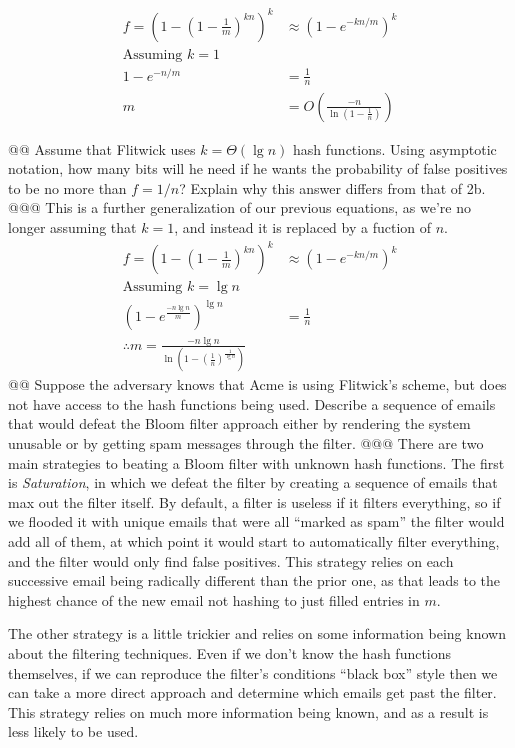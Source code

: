 \documentclass[10pt]{article}
\begin{document}
\begin{easylist}[enumerate]
    \[ \begin{aligned}
        f = {\left(1 - {\left( 1 - \frac{1}{m} \right)}^{kn} \right)}^k &\approx {\left( 1 - e^{-kn/m} \right)}^k\\
        \text{Assuming } k = 1\\
        1 -  e^{-n/m} &= \frac{1}{n}\\
        m &= O\left( \frac{-n}{\ln\left( 1 - \frac{1}{n} \right)} \right)
    \end{aligned} \]

    @@ Assume that Flitwick uses $k = \Theta(\lg n)$ hash functions. Using asymptotic notation, how many bits will he
    need if he wants the probability of false positives to be no more than $f = 1/n$? Explain why this answer differs
    from that of 2b.
    @@@ This is a further generalization of our previous equations, as we're no longer assuming that $k=1$, and instead
    it is replaced by a fuction of $n$.
    \[ \begin{aligned}
        f = {\left(1 - {\left( 1 - \frac{1}{m} \right)}^{kn} \right)}^k &\approx {\left( 1 - e^{-kn/m} \right)}^k\\
        \text{Assuming } k = \lg n\\
        {\left(1 - e^{\frac{-n\lg n}{m}} \right)}^{\lg n} &= \frac{1}{n}\\
        \therefore m = \frac{-n\lg n}{\ln \left( 1 - {\left( \frac{1}{n} \right)}^\frac{1}{\lg n}\right)}
    \end{aligned} \]
    @@ Suppose the adversary knows that Acme is using Flitwick's scheme, but does not have access to the hash functions
    being used. Describe a sequence of emails that would defeat the Bloom filter approach either by rendering the system
    unusable or by getting spam messages through the filter.
    @@@ There are two main strategies to beating a Bloom filter with unknown hash functions. The first is
    \textit{Saturation}, in which we defeat the filter by creating a sequence of emails that max out the filter itself.
    By default, a filter is useless if it filters everything, so if we flooded it with unique emails that were all
    ``marked as spam'' the filter would add all of them, at which point it would start to automatically filter
    everything, and the filter would only find false positives. This strategy relies on each successive email being
    radically different than the prior one, as that leads to the highest chance of the new email not hashing to just
    filled entries in $m$.

    The other strategy is a little trickier and relies on some information being known about the filtering techniques.
    Even if we don't know the hash functions themselves, if we can reproduce the filter's conditions ``black box'' style
    then we can take a more direct approach and determine which emails get past the filter. This strategy relies on much
    more information being known, and as a result is less likely to be used.


\end{easylist}
\end{document}
